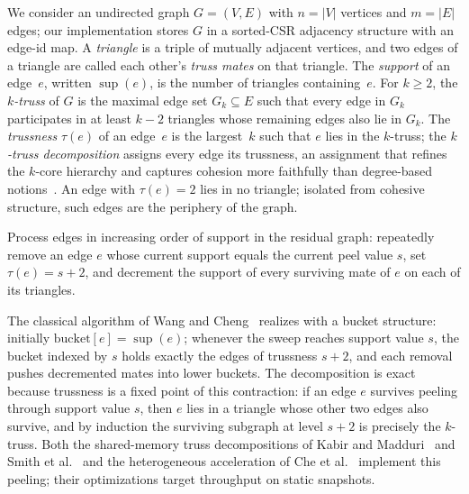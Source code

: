 \label{sec:background}

We consider an undirected graph $G=(V,E)$ with $n=|V|$ vertices and $m=|E|$ edges; our implementation stores $G$ in a sorted-CSR adjacency structure with an edge-id map.
A \emph{triangle} is a triple of mutually adjacent vertices, and two edges of a triangle are called each other's \emph{truss mates} on that triangle.
The \emph{support} of an edge~$e$, written $\sup(e)$, is the number of triangles containing~$e$.
For $k\ge 2$, the \emph{$k$-truss} of $G$ is the maximal edge set $G_k\subseteq E$ such that every edge in $G_k$ participates in at least $k-2$ triangles whose remaining edges also lie in $G_k$.
The \emph{trussness} $\tau(e)$ of an edge~$e$ is the largest~$k$ such that $e$ lies in the $k$-truss; the \emph{$k$-truss decomposition} assigns every edge its trussness, an assignment that refines the $k$-core hierarchy and captures cohesion more faithfully than degree-based notions~\cite{wang2012truss,burkhardt2018bounds}.
An edge with $\tau(e)=2$ lies in no triangle; isolated from cohesive structure, such edges are the periphery of the graph.

\begin{definition}
\label{def:peeling}
Process edges in increasing order of support in the residual graph: repeatedly remove an edge $e$ whose current support equals the current peel value $s$, set $\tau(e)=s+2$, and decrement the support of every surviving mate of $e$ on each of its triangles.
\end{definition}

The classical algorithm of Wang and Cheng~\cite{wang2012truss} realizes  with a bucket structure: initially $\mathrm{bucket}[e]=\sup(e)$; whenever the sweep reaches support value $s$, the bucket indexed by $s$ holds exactly the edges of trussness $s+2$, and each removal pushes decremented mates into lower buckets.
The decomposition is exact because trussness is a fixed point of this contraction: if an edge $e$ survives peeling through support value $s$, then $e$ lies in a triangle whose other two edges also survive, and by induction the surviving subgraph at level $s+2$ is precisely the $k$-truss.
Both the shared-memory truss decompositions of Kabir and Madduri~\cite{kabir2017sharedmemory} and Smith et al.~\cite{smith2017truss} and the heterogeneous acceleration of Che et al.~\cite{che2020accelerating} implement this peeling; their optimizations target throughput on static snapshots.

